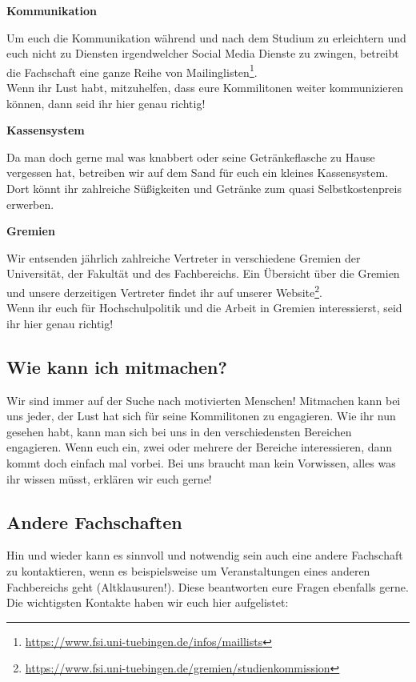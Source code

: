 \textbf{Kommunikation}

Um euch die Kommunikation während und nach dem Studium zu erleichtern und euch nicht zu Diensten irgendwelcher Social Media Dienste zu zwingen, betreibt die Fachschaft eine ganze Reihe von Mailinglisten\footnote{\url{https://www.fsi.uni-tuebingen.de/infos/maillists}}. \\	%
Wenn ihr Lust habt, mitzuhelfen, dass eure Kommilitonen weiter kommunizieren können, dann seid ihr hier genau richtig!

\textbf{Kassensystem}

Da man doch gerne mal was knabbert oder seine Getränkeflasche zu Hause vergessen hat, betreiben wir auf dem Sand für euch ein kleines Kassensystem. Dort könnt ihr zahlreiche Süßigkeiten und Getränke zum quasi Selbstkostenpreis erwerben. 

\textbf{Gremien}

Wir entsenden jährlich zahlreiche Vertreter in verschiedene Gremien der Universität, der Fakultät und des Fachbereichs. Ein Übersicht über die Gremien und unsere derzeitigen Vertreter findet ihr auf unserer Website\footnote{\url{https://www.fsi.uni-tuebingen.de/gremien/studienkommission}}. \\	%
Wenn ihr euch für Hochschulpolitik und die Arbeit in Gremien interessierst, seid ihr hier genau richtig!

%
\subsection{Wie kann ich mitmachen?}
Wir sind immer auf der Suche nach motivierten Menschen! Mitmachen kann bei uns jeder, der Lust hat sich für seine Kommilitonen zu engagieren. Wie ihr nun gesehen habt, kann man sich bei uns in den verschiedensten Bereichen engagieren. Wenn euch ein, zwei oder mehrere der Bereiche interessieren, dann kommt doch einfach mal vorbei. Bei uns braucht man kein Vorwissen, alles was ihr wissen müsst, erklären wir euch gerne!

\vfill
\subsection{Andere Fachschaften}
Hin und wieder kann es sinnvoll und notwendig sein auch eine andere Fachschaft zu kontaktieren, wenn es beispielsweise um Veranstaltungen eines anderen Fachbereichs geht (Altklausuren!). Diese beantworten eure Fragen ebenfalls gerne. Die wichtigsten Kontakte haben wir euch hier aufgelistet:

